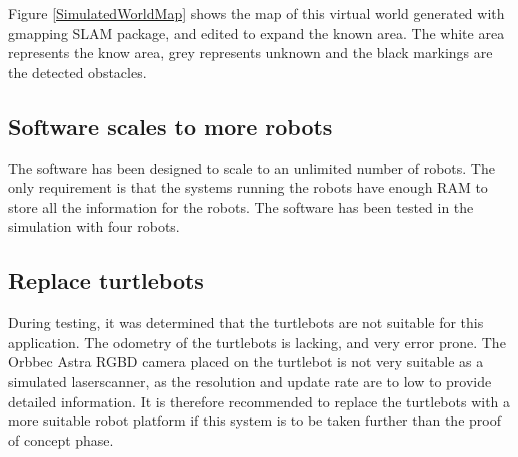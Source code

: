 \documentclass[10pt, journal]{IEEEtran}
\begin{document}
Figure \ref{SimulatedWorldMap} shows the map of this virtual world generated with gmapping SLAM package\cite{SLAMGmapping}, and edited to expand the known area. The white area represents the know area, grey represents unknown and the black markings are the detected obstacles.
\subsection{Software scales to more robots}
The software has been designed to scale to an unlimited number of robots. The only requirement is that the systems running the robots have enough RAM to store all the information for the robots. The software has been tested in the simulation with four robots.
\subsection{Replace turtlebots}
During testing, it was determined that the turtlebots are not suitable for this application. The odometry of the turtlebots is lacking, and very error prone. The Orbbec Astra RGBD camera placed on the turtlebot is not very suitable as a simulated laserscanner, as the resolution and update rate are to low to provide detailed information. It is therefore recommended to replace the turtlebots with a more suitable robot platform if this system is to be taken further than the proof of concept phase.



\end{document}

